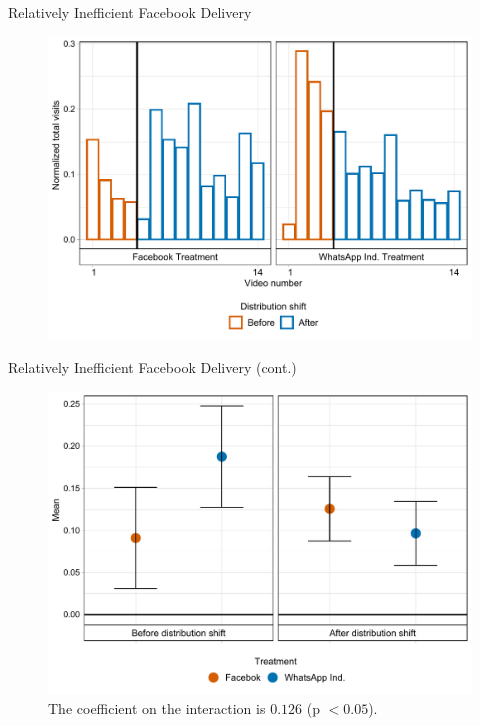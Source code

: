 \documentclass[10pt]{beamer}
\begin{document}
\begin{frame}{Relatively Inefficient Facebook Delivery}
\begin{figure}[H]
\includegraphics[width=1\textwidth]{Figures/Other/dist_change.pdf}
\captionsetup{width=.85\linewidth}
\label{fig:fb_shifts}
\end{figure}
\end{frame}

\begin{frame}{Relatively Inefficient Facebook Delivery (cont.)}
\begin{figure}[H]
\includegraphics[width=1\textwidth]{Figures/Other/dist_dotted.pdf}
    \captionsetup{width=.75\linewidth}
    \caption*{\footnotesize  {} %
    The coefficient on the interaction is $0.126$ (p $< 0.05$).}
\end{figure}
\end{frame}
\end{document}
